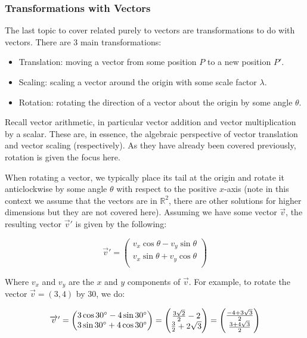 \documentclass[a4paper,oneside]{report}
\begin{document}
\subsubsection{Transformations with Vectors}

The last topic to cover related purely to vectors are transformations to do
with vectors. There are 3 main transformations:

\begin{itemize}
	\item{Translation: moving a vector from some position \( P \) to a
		new position \( P' \).}
	\item{Scaling: scaling a vector around the origin with some scale
		factor \( \lambda \).}
	\item{Rotation: rotating the direction of a vector about the origin
		by some angle \( \theta \).}
\end{itemize}

Recall vector arithmetic, in particular vector addition and vector
multiplication by a scalar. These are, in essence, the algebraic perspective
of vector translation and vector scaling (respectively). As they have already
been covered previously, rotation is given the focus here.

When rotating a vector, we typically place its tail at the origin and rotate
it anticlockwise by some angle \( \theta \) with respect to the positive
\( x \)-axis (note in this context we assume that the vectors are in
\( \mathbb{R}^2 \), there are other solutions for higher dimensions but they
are not covered here). Assuming we have some vector \( \overrightarrow{v} \),
the resulting vector \( \overrightarrow{v}' \) is given by the following:

\[ \overrightarrow{v}' = \begin{pmatrix}
	v_x \cos{\theta} - v_y \sin{\theta} \\
	v_x \sin{\theta} + v_y \cos{\theta} \\
\end{pmatrix} \]

Where \( v_x \) and \( v_y \) are the \( x \) and \( y \) components of
\( \overrightarrow{v} \). For example, to rotate the vector
\( \overrightarrow{v} = (3, 4) \) by 30\degree, we do:

\[ \overrightarrow{v}' = \begin{pmatrix}
	3 \cos{30\degree} - 4 \sin{30\degree} \\
	3 \sin{30\degree} + 4 \cos{30\degree} \\
\end{pmatrix} = \begin{pmatrix}
	\frac{3 \sqrt{2}}{2} - 2 \\
	\frac{3}{2} + 2 \sqrt{3} \\
\end{pmatrix} = \begin{pmatrix}
	\frac{-4 + 3 \sqrt{3}}{2} \\
	\frac{3 + 4 \sqrt{3}}{2} \\
\end{pmatrix} \]
\end{document}
